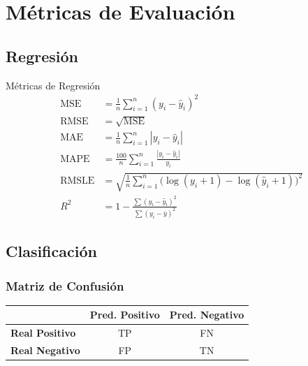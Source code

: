 \documentclass[12pt, a4paper]{article}
\begin{document}
\section{Métricas de Evaluación}

\subsection{Regresión}

\begin{defbox}{Métricas de Regresión}
	\begin{align}
		\text{MSE}   & = \frac{1}{n}\sum_{i=1}^{n}(y_i - \hat{y}_i)^2                                \\[4pt]
		\text{RMSE}  & = \sqrt{\text{MSE}}                                                           \\[4pt]
		\text{MAE}   & = \frac{1}{n}\sum_{i=1}^{n}|y_i - \hat{y}_i|                                  \\[4pt]
		\text{MAPE}  & = \frac{100}{n}\sum_{i=1}^{n}\frac{|y_i - \hat{y}_i|}{y_i}                    \\[4pt]
		\text{RMSLE} & = \sqrt{\frac{1}{n}\sum_{i=1}^{n}\bigl(\log(y_i+1)-\log(\hat{y}_i+1)\bigr)^2} \\[4pt]
		R^2          & = 1 - \frac{\sum(y_i-\hat{y}_i)^2}{\sum(y_i-\bar{y})^2}
	\end{align}
\end{defbox}

\subsection{Clasificación}

\subsubsection{Matriz de Confusión}

\begin{center}
	\begin{tabular}{lcc}
		\toprule
		                       & \textbf{Pred. Positivo} & \textbf{Pred. Negativo} \\
		\midrule
		\textbf{Real Positivo} & \textcolor{verde}{TP}   & \textcolor{rojo}{FN}    \\
		\textbf{Real Negativo} & \textcolor{rojo}{FP}    & \textcolor{verde}{TN}   \\
		\bottomrule
	\end{tabular}
\end{center}
\end{document}
